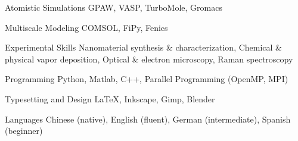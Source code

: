 

\begin{cvskills}
  \cvskill
  {Atomistic Simulations}
  {GPAW, VASP, TurboMole, Gromacs}

  \cvskill
  {Multiscale Modeling}
  {COMSOL, FiPy, Fenics}

  \cvskill
  {Experimental Skills}
  {
    Nanomaterial synthesis \& characterization, 
    Chemical \& physical vapor deposition, \newline
    Optical \& electron microscopy,
    Raman spectroscopy
  }

  \cvskill
  {Programming}
  {Python, Matlab, C++, Parallel Programming (OpenMP, MPI)}

  \cvskill
  {Typesetting and Design}
  {\LaTeX, Inkscape, Gimp, Blender}

  \cvskill
  {Languages}
  {Chinese (native), English (fluent),
    German (intermediate), Spanish (beginner)}
\end{cvskills}
